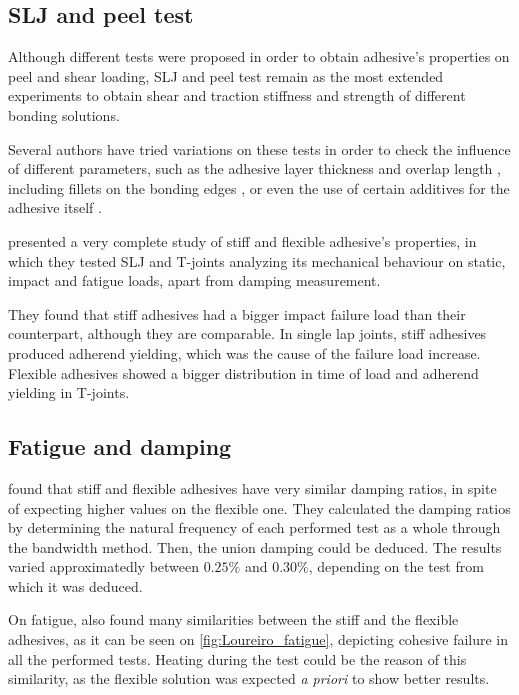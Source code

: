 \documentclass[
documentsize = a4, %
font = cmr, %
typesize = 11, %
printmode = true,
onehalfspacing = true,
language = en, %
titlepage = udciccp, %
degree = pt, %
dedication = true,
acknowledgements = true,
abstract-en = true,
abstract-es = false,
abstract-ga = false,
epigraphs = true,
toc = true,
lof = true,
lot = true,
frontmatterintoc = false,
notation = false,
minimal = false,
]{UDCthesis}
\begin{document}
\subsection{\Acrlong{SLJ} and peel test}

Although different tests were proposed \citep{Kihara2003, Raykhere2010} in order to obtain adhesive's properties on peel and shear loading, \acrfull{SLJ} and peel test remain as the most extended experiments to obtain shear and traction stiffness and strength of different bonding solutions.

Several authors have tried variations on these tests in order to check the influence of different parameters, such as the adhesive layer thickness and overlap length \citep{Liao2011}, including fillets on the bonding edges \citep{Grant2009}, or even the use of certain additives for the adhesive itself \citep{Vaidya2006}.

\citet{Loureiro2010} presented a very complete study of stiff and flexible adhesive's properties, in which they tested \acrlong{SLJ} and T-joints analyzing its mechanical behaviour on static, impact and fatigue loads, apart from damping measurement.

They found that stiff adhesives had a bigger impact failure load than their counterpart, although they are comparable. In single lap joints, stiff adhesives produced adherend yielding, which was the cause of the failure load increase. Flexible adhesives showed a bigger distribution in time of load and adherend yielding in T-joints.

\subsection{Fatigue and damping}
\citet{Loureiro2010} found that stiff and flexible adhesives have very similar damping ratios, in spite of expecting higher values on the flexible one. They calculated the damping ratios by determining the natural frequency of each performed test as a whole through the bandwidth method. Then, the union damping could be deduced. The results varied approximatedly between $0.25\%$ and $0.30\%$, depending on the test from which it was deduced.

On fatigue, \citet{Loureiro2010} also found many similarities between the stiff and the flexible adhesives, as it can be seen on \cref{fig:Loureiro_fatigue}, depicting cohesive failure in all the performed tests. Heating during the test could be the reason of this similarity, as the flexible solution was expected \textit{a priori} to show better results.
\end{document}
